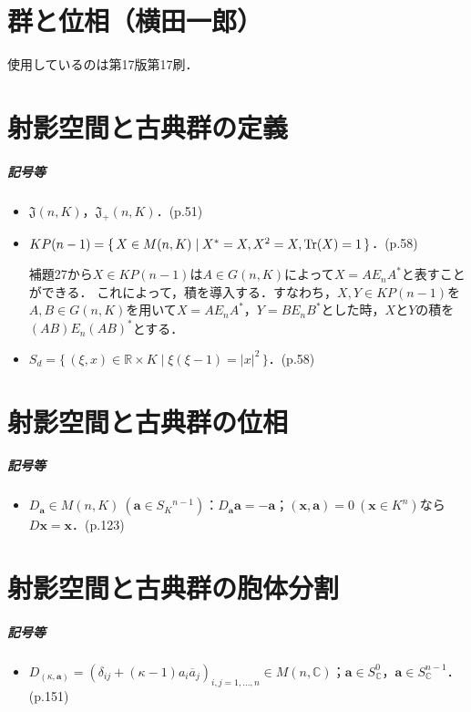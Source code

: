 \documentclass[a4paper, leqno]{ltjsreport}
\begin{document}
\chapter*{群と位相（横田一郎）}
使用しているのは第17版第17刷．

\chapter{射影空間と古典群の定義}
\paragraph{記号等}
\begin{itemize}
  \item $\mathfrak{J}(n, K)$，$\mathfrak{J}_+(n, K)$．(p.51)
  \item $KP(n-1) = \{\, X \in M(n, K) \mid X^\ast=X, X^2=X, \operatorname{Tr}(X)=1 \,\}$．(p.58)\par
  補題27から$X\in KP(n-1)$は$A\in G(n, K)$によって$X=AE_nA^\ast$と表すことができる．
  これによって，積を導入する．すなわち，$X, Y\in KP(n-1)$を$A, B\in G(n, K)$を用いて$X=AE_nA^\ast$，$Y=BE_nB^\ast$とした時，$X$と$Y$の積を$(AB)E_n(AB)^\ast$とする．
  \item $S_d=\{\, (\xi, x) \in \mathbb{R} \times K \mid \xi(\xi - 1) = \lvert x\rvert^2 \,\}$．(p.58)
\end{itemize}

\chapter{射影空間と古典群の位相}
\paragraph{記号等}
\begin{itemize}
  \item $D_{\boldsymbol{a}}\in M(n, K)~ (\boldsymbol{a} \in S_K{}^{n-1})$：$D_{\boldsymbol{a}}\boldsymbol{a}=-\boldsymbol{a}$；$(\boldsymbol{x}, \boldsymbol{a}) = 0\ (\boldsymbol{x}\in K^n)$なら$D\boldsymbol{x}=\boldsymbol{x}$．(p.123)
\end{itemize}

\chapter{射影空間と古典群の胞体分割}
\paragraph{記号等}
\begin{itemize}
  \item $D_{(\kappa, \boldsymbol{a})} = (\delta_{ij} + (\kappa - 1) a_i \overline{a}_j)_{i,j=1,\ldots,n} \in M(n, \mathbb{C})$；$\boldsymbol{a} \in S_\mathbb{C}^0$，$\boldsymbol{a} \in S_\mathbb{C}^{n-1}$．(p.151)
\end{itemize}
\end{document}
